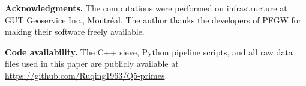 \documentclass[11pt,a4paper]{article}
\theoremstyle{plain}
\theoremstyle{definition}
\theoremstyle{remark}
\begin{document}

\medskip
\noindent\textbf{Acknowledgments.}
The computations were performed on infrastructure at GUT Geoservice Inc., Montr\'eal. The author thanks the developers of PFGW for making their software freely available.

\medskip
\noindent\textbf{Code availability.}
The C++ sieve, Python pipeline scripts, and all raw data files used in this paper are publicly available at \url{https://github.com/Ruqing1963/Q5-primes}.

\end{document}
